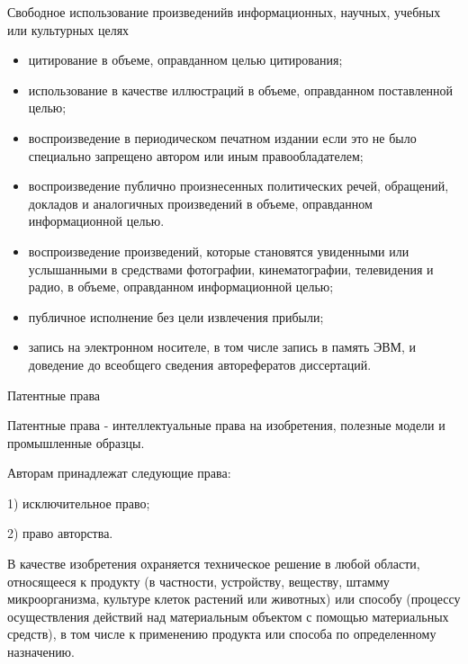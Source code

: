 \documentclass[_Venture_p2.tex]{subfiles}
\begin{document}
\begin{frame}[ allowframebreaks]{Свободное использование произведений}{в информационных, научных, учебных или культурных целях}
\begin{itemize}
	\item цитирование в объеме, оправданном целью цитирования;
	\item использование в качестве иллюстраций в объеме, оправданном поставленной целью;
	\item воспроизведение в периодическом печатном издании если это не было специально запрещено автором или иным правообладателем;
	\item воспроизведение публично произнесенных политических речей, обращений, докладов и аналогичных произведений в объеме, оправданном информационной целью. 
	
	\pagebreak
	\item воспроизведение произведений, которые становятся увиденными или услышанными в средствами фотографии, кинематографии, телевидения и радио, в объеме, оправданном информационной целью;
	\item публичное исполнение без цели извлечения прибыли;
	\item запись на электронном носителе, в том числе запись в память ЭВМ, и доведение до всеобщего сведения авторефератов диссертаций.
\end{itemize}
\end{frame}

\begin{frame}{Патентные права}

\begin{block}{Патентные права}
	\quad - интеллектуальные права на изобретения, полезные модели и промышленные образцы.
\end{block}
Авторам принадлежат следующие права:

1) исключительное право;

2) право авторства.
\end{frame}

\begin{frame}
В качестве изобретения охраняется техническое решение в любой области, относящееся к продукту (в частности, устройству, веществу, штамму микроорганизма, культуре клеток растений или животных) или способу (процессу осуществления действий над материальным объектом с помощью материальных средств), в том числе к применению продукта или способа по определенному назначению.
\end{frame}
\end{document}
